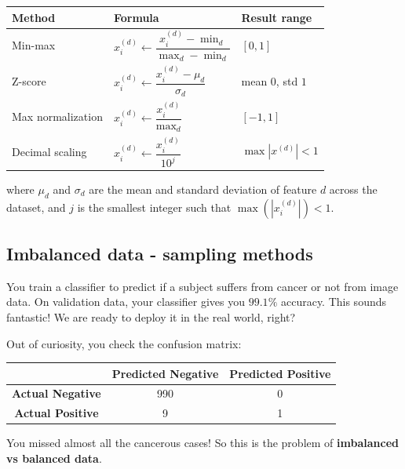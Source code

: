 \documentclass[11pt,a4paper,openany]{book}
\begin{document}
\begin{defnbox}[title=Normalization methods]
\renewcommand{\arraystretch}{1.6}
\begin{tabular}{l l l}
\textbf{Method} & \textbf{Formula} & \textbf{Result range} \\
\hline
Min-max & $x_i^{(d)} \leftarrow \dfrac{x_i^{(d)} - \min_d}{\max_d - \min_d}$ & $[0, 1]$ \\[8pt]
Z-score & $x_i^{(d)} \leftarrow \dfrac{x_i^{(d)} - \mu_d}{\sigma_d}$ & mean $0$, std $1$ \\[8pt]
Max normalization & $x_i^{(d)} \leftarrow \dfrac{x_i^{(d)}}{\max_d}$ & $[-1, 1]$ \\[8pt]
Decimal scaling & $x_i^{(d)} \leftarrow \dfrac{x_i^{(d)}}{10^j}$ & $\max|x^{(d)}| < 1$ \\
\end{tabular}

\medskip
where $\mu_d$ and $\sigma_d$ are the mean and standard deviation of feature $d$ across the dataset, and $j$ is the smallest integer such that $\max(|x_i^{(d)}|) < 1$.
\end{defnbox}

\vspace{8cm}

\subsection{Imbalanced data - sampling methods}

You train a classifier to predict if a subject suffers from cancer or not from image data. On validation data, your classifier gives you $99.1\%$ accuracy. This sounds fantastic! We are ready to deploy it in the real world, right?

Out of curiosity, you check the confusion matrix:

\begin{center}
\renewcommand{\arraystretch}{1.2}
\begin{tabular}{c|cc}
 & \textbf{Predicted Negative} & \textbf{Predicted Positive} \\
\hline
\textbf{Actual Negative} & 990 & 0 \\
\textbf{Actual Positive} & 9 & 1 \\
\end{tabular}
\end{center}

You missed almost all the cancerous cases! So this is the problem of \textbf{imbalanced vs balanced data}.
\end{document}

